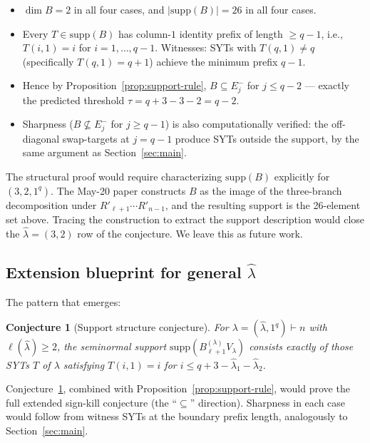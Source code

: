 \documentclass[11pt]{article}
\newtheorem{conjecture}[theorem]{Conjecture}
\theoremstyle{definition}
\newcommand{\hatl}{\widehat\lambda}
\begin{document}
\begin{itemize}[topsep=0.3em,itemsep=0.1em]
\item $\dim B = 2$ in all four cases, and $|\mathrm{supp}(B)| = 26$
  in all four cases.
\item Every $T \in \mathrm{supp}(B)$ has column-$1$ identity prefix
  of length $\ge q - 1$, i.e., $T(i, 1) = i$ for $i = 1, \ldots, q-1$.
  Witnesses: SYTs with $T(q, 1) \ne q$ (specifically $T(q, 1) = q+1$)
  achieve the minimum prefix $q - 1$.
\item Hence by Proposition~\ref{prop:support-rule},
  $B \subseteq E_j^-$ for $j \le q - 2$ — exactly the predicted
  threshold $\tau = q + 3 - 3 - 2 = q - 2$.
\item Sharpness ($B \not\subseteq E_j^-$ for $j \ge q-1$) is also
  computationally verified: the off-diagonal swap-targets at $j = q-1$
  produce SYTs outside the support, by the same argument as
  Section~\ref{sec:main}.
\end{itemize}

The structural proof would require characterizing $\mathrm{supp}(B)$
explicitly for $(3, 2, 1^q)$.  The May-20 paper constructs $B$ as the
image of the three-branch decomposition under
$R'_{\ell+1}\cdots R'_{n-1}$, and the resulting support is the
26-element set above.  Tracing the construction to extract the
support description would close the $\hatl = (3, 2)$ row of the
conjecture.  We leave this as future work.

\subsection{Extension blueprint for general $\hatl$}

The pattern that emerges:

\begin{conjecture}[Support structure conjecture]\label{conj:support}
For $\lambda = (\hatl, 1^q) \vdash n$ with $\ell(\hatl) \ge 2$, the
seminormal support $\mathrm{supp}(B^{(\lambda)}_{\ell+1} V_\lambda)$
consists exactly of those SYTs $T$ of $\lambda$ satisfying
$T(i, 1) = i$ for $i \le q + 3 - \hatl_1 - \hatl_2$.
\end{conjecture}

Conjecture~\ref{conj:support}, combined with
Proposition~\ref{prop:support-rule}, would prove the full extended
sign-kill conjecture (the ``$\subseteq$'' direction).  Sharpness in
each case would follow from witness SYTs at the boundary prefix
length, analogously to Section~\ref{sec:main}.
\end{document}
